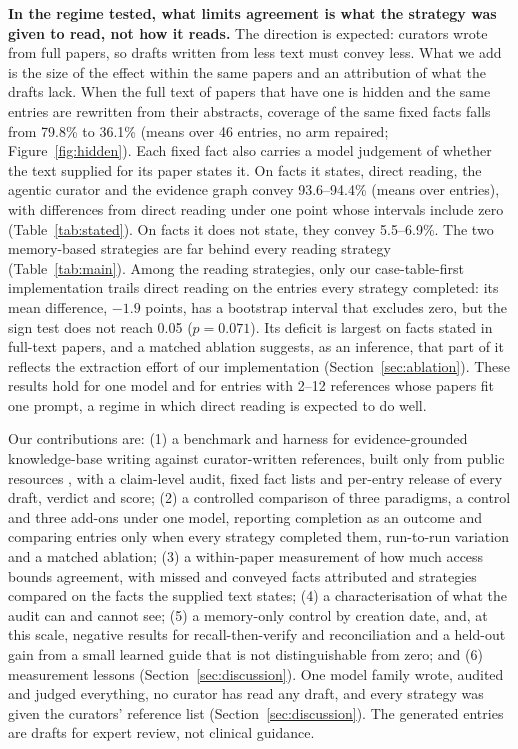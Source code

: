 \documentclass{article} %
\begin{document}
\textbf{In the regime tested, what limits agreement is what the strategy was given to read, not how it reads.} The direction is expected: curators wrote from full papers, so drafts written from less text must convey less. What we add is the size of the effect within the same papers and an attribution of what the drafts lack. When the full text of papers that have one is hidden and the same entries are rewritten from their abstracts, coverage of the same fixed facts falls from 79.8\% to 36.1\% (means over 46 entries, no arm repaired; Figure~\ref{fig:hidden}). Each fixed fact also carries a model judgement of whether the text supplied for its paper states it. On facts it states, direct reading, the agentic curator and the evidence graph convey 93.6--94.4\% (means over entries), with differences from direct reading under one point whose intervals include zero (Table~\ref{tab:stated}). On facts it does not state, they convey 5.5--6.9\%. The two memory-based strategies are far behind every reading strategy (Table~\ref{tab:main}). Among the reading strategies, only our case-table-first implementation trails direct reading on the entries every strategy completed: its mean difference, $-1.9$ points, has a bootstrap interval that excludes zero, but the sign test does not reach 0.05 ($p=0.071$). Its deficit is largest on facts stated in full-text papers, and a matched ablation suggests, as an inference, that part of it reflects the extraction effort of our implementation (Section~\ref{sec:ablation}). These results hold for one model and for entries with 2--12 references whose papers fit one prompt, a regime in which direct reading is expected to do well.

Our contributions are: (1) a benchmark and harness for evidence-grounded knowledge-base writing against curator-written references, built only from public resources \citep{sayers2026database,Louden2020MedgenNcbis,rosonovski2024europe,seal2023genenames}, with a claim-level audit, fixed fact lists and per-entry release of every draft, verdict and score; (2) a controlled comparison of three paradigms, a control and three add-ons under one model, reporting completion as an outcome and comparing entries only when every strategy completed them, run-to-run variation and a matched ablation; (3) a within-paper measurement of how much access bounds agreement, with missed and conveyed facts attributed and strategies compared on the facts the supplied text states; (4) a characterisation of what the audit can and cannot see; (5) a memory-only control by creation date, and, at this scale, negative results for recall-then-verify and reconciliation and a held-out gain from a small learned guide that is not distinguishable from zero; and (6) measurement lessons (Section~\ref{sec:discussion}). One model family wrote, audited and judged everything, no curator has read any draft, and every strategy was given the curators' reference list (Section~\ref{sec:discussion}). The generated entries are drafts for expert review, not clinical guidance.
\end{document}
